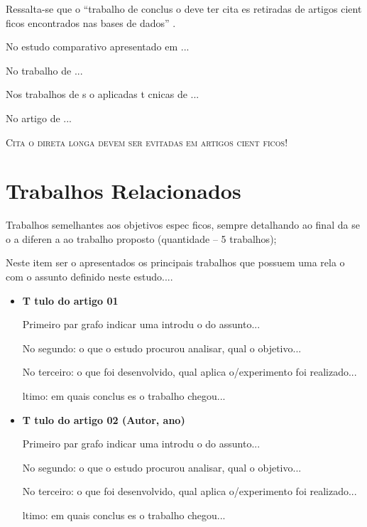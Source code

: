 \documentclass{article}
\begin{document}
Ressalta-se que o \enquote{trabalho de conclus o deve ter cita es retiradas de artigos cient ficos encontrados nas bases de dados} \cite{spinello2024}.

No estudo comparativo apresentado em \textcite[p. 107]{rabello2010} ...

No trabalho de \textcite{pargaonkar2021} ...

Nos trabalhos de \textcites{badgujar2024}{pargaonkar2021} s o aplicadas t cnicas de ...

No artigo de \textcite{estevao2023} ...

\textsc{Cita o direta longa devem ser evitadas em artigos cient ficos!}

\section{Trabalhos Relacionados}

Trabalhos semelhantes aos objetivos espec ficos, sempre detalhando ao final da se o a
diferen a ao trabalho proposto (quantidade -- 5 trabalhos);

Neste item ser o apresentados os principais trabalhos que possuem uma rela o com o assunto definido neste estudo....

\begin{itemize}
     \item \textbf{T tulo do artigo 01 \cite{ogliari2019}}
     
     Primeiro par grafo indicar uma introdu o do assunto...
     
     No segundo: o que o estudo procurou analisar, qual o objetivo...
     
     No terceiro: o que foi desenvolvido, qual aplica o/experimento foi realizado...
     
      ltimo: em quais conclus es o trabalho chegou...
    \newline
    
    \item \textbf{T tulo do artigo 02 (Autor, ano)}
    
     Primeiro par grafo indicar uma introdu o do assunto...
     
     No segundo: o que o estudo procurou analisar, qual o objetivo...
     
     No terceiro: o que foi desenvolvido, qual aplica o/experimento foi realizado...
     
      ltimo: em quais conclus es o trabalho chegou...
    
\end{itemize}
\end{document}
